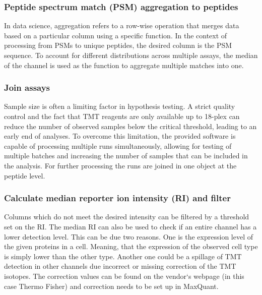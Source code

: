 \documentclass[
  11pt,
]{article}
\begin{document}
\hypertarget{peptide-spectrum-match-psm-aggregation-to-peptides}{%
\subsubsection{Peptide spectrum match (PSM) aggregation to
peptides}\label{peptide-spectrum-match-psm-aggregation-to-peptides}}

In data science, aggregation refers to a row-wise operation that merges
data based on a particular column using a specific function. In the
context of processing from PSMs to unique peptides, the desired column
is the PSM sequence. To account for different distributions across
multiple assays, the median of the channel is used as the function to
aggregate multiple matches into one.

\hypertarget{join-assays}{%
\subsubsection{Join assays}\label{join-assays}}

Sample size is often a limiting factor in hypothesis testing. A strict
quality control and the fact that TMT reagents are only available up to
18-plex can reduce the number of observed samples below the critical
threshold, leading to an early end of analyses. To overcome this
limitation, the provided software is capable of processing multiple runs
simultaneously, allowing for testing of multiple batches and increasing
the number of samples that can be included in the analysis. For further
processing the runs are joined in one object at the peptide level.

\hypertarget{calculate-median-reporter-ion-intensity-ri-and-filter}{%
\subsubsection{Calculate median reporter ion intensity (RI) and
filter}\label{calculate-median-reporter-ion-intensity-ri-and-filter}}

Columns which do not meet the desired intensity can be filtered by a
threshold set on the RI. The median RI can also be used to check if an
entire channel has a lower detection level. This can be due two reasons.
One is the expression level of the given proteins in a cell. Meaning,
that the expression of the observed cell type is simply lower than the
other type. Another one could be a spillage of TMT detection in other
channels due incorrect or missing correction of the TMT isotopes. The
correction values can be found on the vendor`s webpage (in this case
Thermo Fisher) and correction needs to be set up in MaxQuant.
\end{document}
